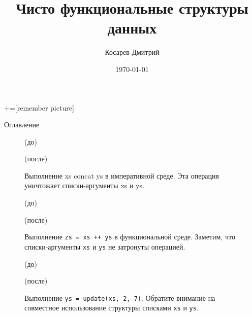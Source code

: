 \documentclass[aspectratio=169
  , xcolor={svgnames}
  , hyperref={ colorlinks,citecolor=DeepPink4
             , linkcolor=DarkRed,urlcolor=DarkBlue}
  , russian
  ]{beamer}
\title[]{Чисто функциональные структуры данных}
\author{Косарев Дмитрий }
\institute{матмех СПбГУ}
\date{\today}
\begin{document}
\maketitle

+=[remember picture] 

\everymath{\displaystyle}

\begin{frame}{Оглавление}
  \tableofcontents
\end{frame}

\begin{frame}[fragile]{}
\begin{figure}[h]
	\par
	(до)\par
	\par
	(после)\par
	\caption{Выполнение xs concat ys в императивной среде. Эта операция уничтожает списки-аргументы xs и ys.}
	\label{fig:2.4}
\end{figure}
\end{frame}


\begin{frame}[fragile]{}
\begin{figure}[h]
	\centering
	\par
	(до)\par
	\vspace{0.5cm}
	\par
	(после)\par
	\vspace{0.5cm}
	\caption{Выполнение \texttt{zs = xs ++ ys} в функциональной среде. Заметим, что списки-аргументы \texttt{xs} и \texttt{ys} не затронуты операцией.
	}
	\label{fig:2.5}
\end{figure}
\end{frame}

\begin{frame}[fragile]{}
\begin{figure}[h]
	\centering
	\par
	(до)\par
	\vspace{0.5cm}
	\par
	(после)\par
	\vspace{0.5cm}	
	\caption{Выполнение \texttt{ys = update(xs, 2, 7)}. Обратите
		внимание на совместное использование структуры списками \texttt{xs} и \texttt{ys}.}
	\label{fig:2.6}
\end{figure}
\end{frame}
\end{document}
